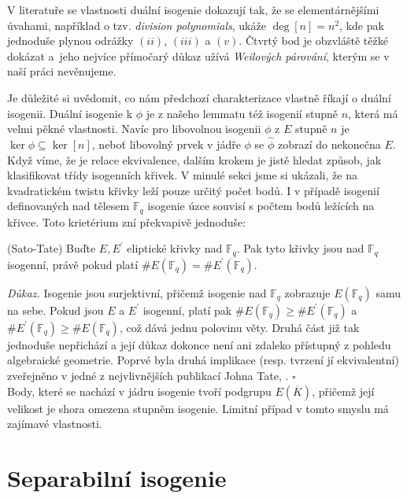 \documentclass [12pt]{report}
\begin{document}
\begin{poznamka}
V literatuře se vlastnosti duální isogenie dokazují tak, že se elementárnějšími úvahami, například o tzv. \textit{division polynomials}, ukáže $\deg [n] = n^2$, kde pak jednoduše plynou odrážky $(ii)$, $(iii)$ a $(v)$. Čtvrtý bod je obzvláště těžké dokázat a~jeho nejvíce přímočarý důkaz užívá \textit{Weilových párování}, kterým se v naší práci nevěnujeme.
\end{poznamka}

Je důležité si uvědomit, co nám předchozí charakterizace vlastně říkají o duální isogenii. Duální isogenie k $\phi$ je z našeho lemmatu též isogenií stupně $n$, která má velmi pěkné vlastnosti. Navíc pro libovolnou isogenii $\phi$ z  $E$ stupně $n$ je $\ker \phi \subseteq \ker [n]$, neboť libovolný prvek v jádře $\phi$ se $\hat{\phi}$ zobrazí do nekonečna $E$.\\

Když víme, že  je relace ekvivalence, dalším krokem je jistě hledat způsob, jak klasifikovat třídy isogenních křivek. V minulé sekci jsme si ukázali, že na kvadratickém twistu křivky leží pouze určitý počet bodů. I v případě isogenií definovaných nad tělesem $\mathbb{F}_q$ isogenie úzce souvisí s počtem bodů ležících na křivce. Toto krietérium zní překvapivě jednoduše:
\begin{veta} (Sato-Tate)
Buďte $E,E^\prime$ eliptické křivky nad $\mathbb{F}_q$. Pak tyto křivky jsou nad $\mathbb{F}_q$ isogenní, právě pokud platí $\#E (\mathbb{F}_q) = \#E^\prime (\mathbb{F}_q)$.
\end{veta}
\noindent \textit{Důkaz.} Isogenie jsou surjektivní, přičemž isogenie nad $\mathbb{F}_q$ zobrazuje $E(\mathbb{F}_q)$ samu na sebe. Pokud jsou $E$ a $E^\prime$ isogenní, platí pak $\#E (\mathbb{F}_q) \geqslant \#E^\prime (\mathbb{F}_q)$ a $\#E^\prime (\mathbb{F}_q) \geqslant \#E (\mathbb{F}_q)$, což dává jednu polovinu věty. Druhá část již tak jednoduše nepřichází a její důkaz dokonce není ani zdaleko přístupný z pohledu algebraické geometrie. Poprvé byla druhá implikace (resp. tvrzení jí ekvivalentní) zveřejněno v jedné z nejvlivnějších publikací Johna Tate, \cite{Tate}. \hfill $\square$\\

Body, které se nachází v jádru isogenie tvoří podgrupu $E(\overline{K})$, přičemž její velikost je shora omezena stupněm isogenie. Limitní případ v tomto smyslu má zajímavé vlastnosti.

\section{Separabilní isogenie}
\end{document}
